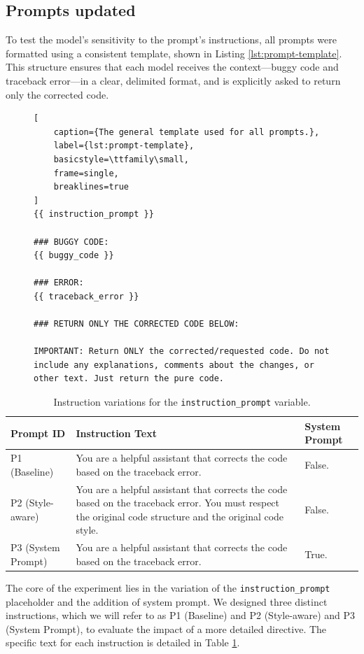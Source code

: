 

\subsection{Prompts updated}

To test the model's sensitivity to the prompt's instructions, all prompts were formatted 
using a consistent template, shown in Listing \ref{lst:prompt-template}. This structure ensures 
that each model receives the context—buggy code and traceback error—in a clear, delimited 
format, and is explicitly asked to return only the corrected code.

\begin{figure}[h!]
\begin{lstlisting}[
    caption={The general template used for all prompts.},
    label={lst:prompt-template},
    basicstyle=\ttfamily\small,
    frame=single,
    breaklines=true
]
{{ instruction_prompt }}

### BUGGY CODE:
{{ buggy_code }}

### ERROR:
{{ traceback_error }}

### RETURN ONLY THE CORRECTED CODE BELOW:

IMPORTANT: Return ONLY the corrected/requested code. Do not include any explanations, comments about the changes, or other text. Just return the pure code.

\end{lstlisting} %
\end{figure}
\begin{table}[h!]
\centering
\caption{Instruction variations for the \texttt{instruction\_prompt} variable.}
\label{tab:prompt-instructions}
\begin{tabular}{|l|p{}|p{}|}
\hline
\textbf{Prompt ID} & \textbf{Instruction Text} & \textbf{System Prompt} \\ \hline
P1 (Baseline) & You are a helpful assistant that corrects the code based on the traceback error. & False. \\\hline
P2 (Style-aware) & You are a helpful assistant that corrects the code based on the traceback error. You must respect the original code structure and the original code style. & False. \\ \hline
P3 (System Prompt) & You are a helpful assistant that corrects the code based on the traceback error. & True. \\ \hline
\end{tabular}
\end{table}
The core of the experiment lies in the variation of the \texttt{instruction\_prompt} placeholder and the addition of system prompt. 
We designed three distinct instructions, which we will refer to as P1 (Baseline) and P2 (Style-aware) and P3 (System Prompt), 
to evaluate the impact of a more detailed directive. The specific text for each instruction 
is detailed in Table \ref{tab:prompt-instructions}.

